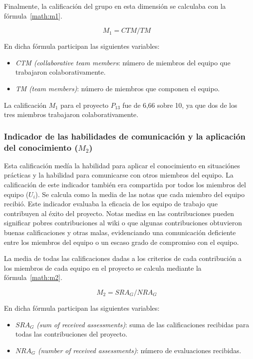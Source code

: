Finalmente, la calificación del grupo en esta dimensión se calculaba con la fórmula~\ref{math:m1}. 

\begin{equation}
    \textbf{$M_1 = CTM/TM$}
    \label{math:m1}
\end{equation}

En dicha fórmula participan las siguientes variables:

\begin{itemize}	
	\item \emph{CTM (collaborative team members}: número de miembros del equipo que trabajaron colaborativamente.
	\item \emph{TM (team members)}: número de miembros que componen el equipo.
\end{itemize} 

La calificación $M_1$ para el proyecto $P_{13}$ fue de 6,66 sobre 10, ya que dos de los tres miembros trabajaron colaborativamente.

\subsubsection{Indicador de las habilidades de comunicación y la aplicación del conocimiento ($M_2$)}

Esta calificación medía la habilidad para aplicar el conocimiento en situaciónes prácticas y la habilidad para comunicarse con otros miembros del equipo. La calificación de este indicador también era compartida por todos los miembros del equipo ($U_i$). Se calcula como la media de las notas que cada miembro del equipo recibió. Este indicador evaluaba la eficacia de los equipo de trabajo que contribuyen al éxito del proyecto. Notas medias en las contribuciones pueden significar pobres contribuciones al wiki o que algunas contribuciones obtuvieron buenas calificaciones y otras malas, evidenciando una comunicación deficiente entre los miembros del equipo o un escaso grado de compromiso con el equipo.

La media de todas las calificaciones dadas a los criterios de cada contribución a los miembros de cada equipo en el proyecto se calcula mediante la fórmula~\ref{math:m2}.

\begin{equation}
    \textbf{$M_2 = SRA_G/NRA_G$}
    \label{math:m2}
\end{equation}

En dicha fórmula participan las siguientes variables:
\begin{itemize}	
	\item \emph{$SRA_G$ (sum of received assessments)}: suma de las calificaciones recibidas para todas las contribuciones del proyecto.
	\item \emph{$NRA_G$ (number of received assessments)}: número de evaluaciones recibidas.
\end{itemize} 

